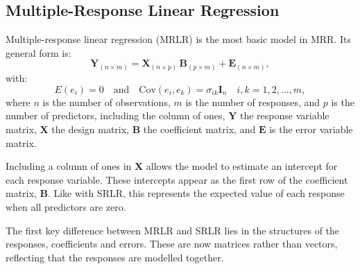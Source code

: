 \documentclass[11pt]{report} %
\begin{document}
\subsection{Multiple-Response Linear Regression}
\label{MRLR Section}
Multiple-response linear regression (MRLR) is the most basic model in MRR. Its general form is:
\begin{equation}
\mathbf{Y}_{(n \times m)} = \mathbf{X}_{(n \times p)} \, \mathbf{B}_{(p \times m)} + \mathbf{E}_{(n \times m)},
\label{MRLR}
\end{equation}
with:
\[
E(e_{i}) = 0 \quad \text{and} \quad \text{Cov}(e_{i}, e_{k}) = \sigma_{ik} \mathbf{I}_n \quad i, k = 1, 2, \dots, m,
\]
where $n$ is the number of observations, $m$ is the number of responses, and $p$ is the number of predictors, including the column of ones, $\mathbf{Y}$ the response variable matrix, $\mathbf{X}$ the design matrix, $\mathbf{B}$ the coefficient matrix, and $\mathbf{E}$ is the error variable matrix. 

Including a column of ones in $\mathbf{X}$ allows the model to estimate an intercept for each response variable. These intercepts appear as the first row of the coefficient matrix, $\mathbf{B}$.
Like with SRLR, this represents the expected value of each response when all predictors are zero.

The first key difference between MRLR and SRLR lies in the structures of the responses, coefficients and errors. These are now matrices rather than vectors, reflecting that the responses are modelled together. 
\end{document}
